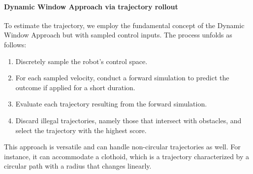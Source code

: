 \paragraph*{Dynamic Window Approach via trajectory rollout}
To estimate the trajectory, we employ the fundamental concept of the Dynamic Window Approach but with sampled control inputs. 
The process unfolds as follows:
\begin{enumerate}
    \item Discretely sample the robot's control space.
    \item For each sampled velocity, conduct a forward simulation to predict the outcome if applied for a short duration.
    \item Evaluate each trajectory resulting from the forward simulation.
    \item Discard illegal trajectories, namely those that intersect with obstacles, and select the trajectory with the highest score.
\end{enumerate}
This approach is versatile and can handle non-circular trajectories as well.
For instance, it can accommodate a clothoid, which is a trajectory characterized by a circular path with a radius that changes linearly.